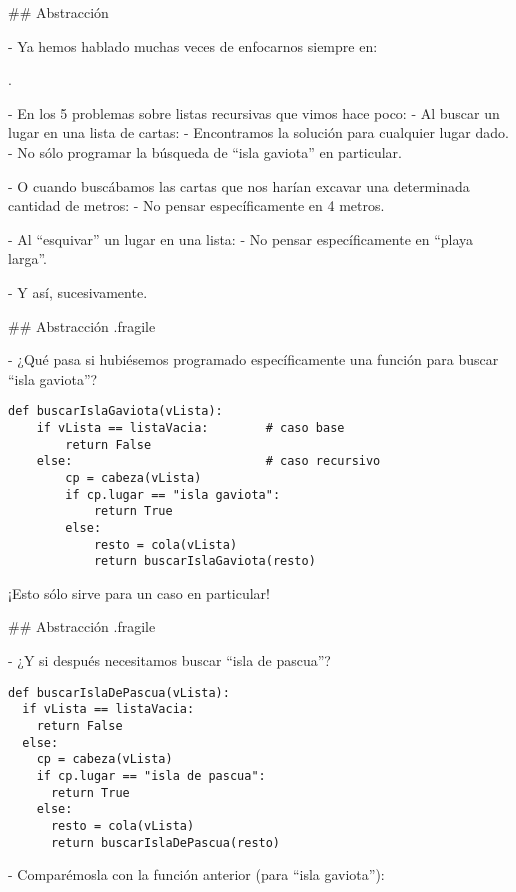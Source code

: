 ## Abstracción

- Ya hemos hablado muchas veces de enfocarnos siempre en:

\bgnblockgood
{}.
\trmblockgood

- En los 5 problemas sobre listas recursivas que vimos hace poco:
    - Al buscar un lugar en una lista de cartas:
        - Encontramos la solución para cualquier lugar dado.
        - No sólo programar la búsqueda de ``isla gaviota'' en particular.

    - O cuando buscábamos las cartas que nos harían excavar una determinada cantidad de metros:
        - No pensar específicamente en 4 metros.

    - Al ``esquivar'' un lugar en una lista:
        - No pensar específicamente en ``playa larga''.

    - Y así, sucesivamente.

## Abstracción {.fragile}

- ¿Qué pasa si hubiésemos programado específicamente una función para buscar
``isla gaviota''?

\begin{lstlisting}[style=frame02]
def buscarIslaGaviota(vLista):
    if vLista == listaVacia:        # caso base
        return False
    else:                           # caso recursivo
        cp = cabeza(vLista)
        if cp.lugar == "isla gaviota":
            return True
        else:
            resto = cola(vLista)
            return buscarIslaGaviota(resto)
\end{lstlisting}

\bgnblockdanger
¡Esto sólo sirve para un caso en particular!
\trmblockdanger

## Abstracción {.fragile}

\bgncolumns
{}

- ¿Y si después necesitamos buscar ``isla de pascua''?

\begin{lstlisting}[style=frame03]
def buscarIslaDePascua(vLista):
  if vLista == listaVacia:
    return False
  else:
    cp = cabeza(vLista)
    if cp.lugar == "isla de pascua":
      return True
    else:
      resto = cola(vLista)
      return buscarIslaDePascua(resto)
\end{lstlisting}


- Comparémosla con la función anterior (para ``isla gaviota''):

